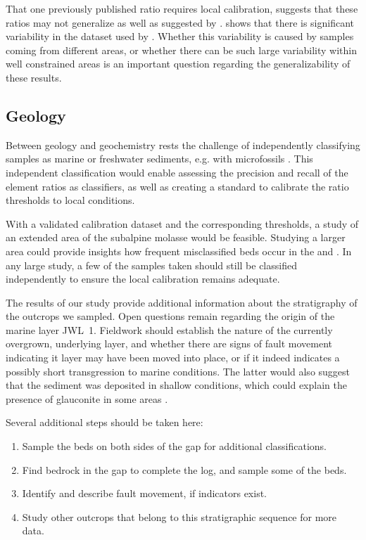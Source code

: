 That one previously published ratio requires local calibration, suggests that 
these ratios may not generalize as well as suggested by \textcite{wei-2020}.  shows that there
is significant variability in the dataset used by \textcite{wei-2020}. 
Whether this variability is caused by samples coming from different areas, or whether there can be such large
variability within well constrained areas is an important question regarding the generalizability of these results.

\subsection{Geology}

Between geology and geochemistry rests the challenge of independently classifying samples as
marine or freshwater sediments, e.g. with microfossils \parencite{kempf_lower_2005}.
This independent classification would enable assessing 
the precision and recall of the element ratios as classifiers, as well as creating a standard to calibrate the
ratio thresholds to local conditions.

With a validated calibration dataset and the corresponding thresholds, a study of an
extended area of the subalpine molasse would be feasible. Studying a larger area could provide
insights how frequent misclassified beds occur in the \USM and \UMM.
In any large study, a few of the samples taken should still be classified independently to ensure
the local calibration remains adequate.

The results of our study provide additional information about the stratigraphy
of the outcrops we sampled. Open questions remain regarding the origin of the marine layer JWL~1.
Fieldwork should establish the nature of the currently overgrown, underlying layer, and 
whether there are signs
of fault movement indicating it layer may have been moved into place, or if it indeed
indicates a possibly short transgression to marine conditions.
The latter would also suggest that the sediment was deposited in shallow conditions, which
could explain the presence of glauconite in some areas \parencite{Linth_Text,nichols-sedi-2023}.

Several additional steps should be taken here:
\begin{enumerate}
    \item Sample the beds on both sides of the gap for additional classifications.
    \item Find bedrock in the gap to complete the log, and sample some of the beds.
    \item Identify and describe fault movement, if indicators exist.
    \item Study other outcrops that belong to this stratigraphic sequence for more data.
\end{enumerate}